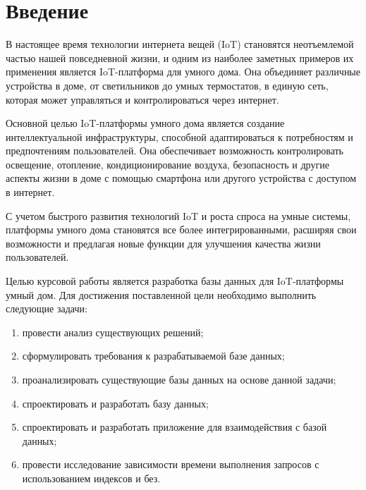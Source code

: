 \chapter*{Введение}

В настоящее время технологии интернета вещей (IoT) становятся 
неотъемлемой частью нашей повседневной жизни, и одним из наиболее 
заметных примеров их применения является IoT-платформа для умного дома. 
Она объединяет различные устройства в доме, от 
светильников до умных термостатов, в единую сеть, которая может 
управляться и контролироваться через интернет.

Основной целью IoT-платформы умного дома является создание 
интеллектуальной инфраструктуры, способной адаптироваться к 
потребностям и предпочтениям пользователей. Она обеспечивает 
возможность контролировать освещение, отопление, кондиционирование 
воздуха, безопасность и другие аспекты жизни в доме с помощью смартфона 
или другого устройства с доступом в интернет.

С учетом быстрого развития технологий IoT и роста спроса на умные 
системы, платформы умного дома становятся все более интегрированными, 
расширяя свои возможности и предлагая новые функции для улучшения 
качества жизни пользователей.

Целью курсовой работы является разработка базы данных для IoT-платформы умный дом. 
Для достижения поставленной цели необходимо выполнить следующие задачи:
\begin{enumerate}
    \item провести анализ существующих решений;
    \item сформулировать требования к разрабатываемой базе данных;
    \item проанализировать существующие базы данных на основе данной задачи;
    \item спроектировать и разработать базу данных;
    \item спроектировать и разработать приложение для взаимодействия с базой данных;
    \item провести исследование зависимости времени выполнения запросов
    с использованием индексов и без.
\end{enumerate}
